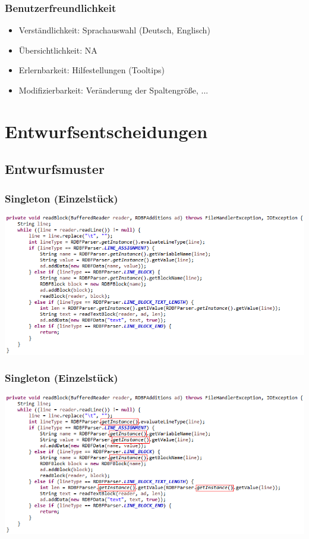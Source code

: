 \documentclass{beamer}
\begin{document}
\begin{frame}
\frametitle{Benutzerfreundlichkeit}
\begin{itemize}
\item Verständlichkeit: Sprachauswahl (Deutsch, Englisch)
\item Übersichtlichkeit: NA
\item Erlernbarkeit: Hilfestellungen (Tooltips)
\item Modifizierbarkeit: Veränderung der Spaltengröße, ...
\end{itemize}
\end{frame}

\section{Entwurfsentscheidungen}
\subsection{Entwurfsmuster}
\begin{frame}
\frametitle{Singleton (Einzelstück)}
\includegraphics[scale=0.5]{../document_data/loadRDBFFile.png}
\end{frame}
\begin{frame}
\frametitle{Singleton (Einzelstück)}
\includegraphics[scale=0.5]{../document_data/loadRDBFFile_instanceMarked.png}
\end{frame}
\end{document}
